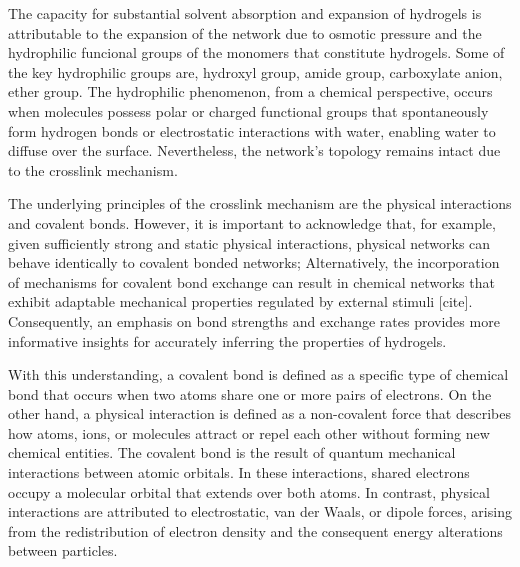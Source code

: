 The capacity for substantial solvent absorption and expansion of hydrogels is attributable to the expansion of the network due to osmotic pressure and the hydrophilic funcional groups of the monomers that constitute hydrogels.
Some of the key hydrophilic groups are,
    hydroxyl group,
    amide group,
    carboxylate anion,
    ether group.
The hydrophilic phenomenon, from a chemical perspective, occurs when molecules possess polar or charged functional groups that spontaneously form hydrogen bonds or electrostatic interactions with water, enabling water to diffuse over the surface.
Nevertheless, the network's topology remains intact due to the crosslink mechanism\citep{lelePredictionsBoundWater1997}.


The underlying principles of the crosslink mechanism are the physical interactions and covalent bonds. 
However, it is important to acknowledge that, for example, given sufficiently strong and static physical interactions, physical networks can behave identically to covalent bonded networks; 
Alternatively, the incorporation of mechanisms for covalent bond exchange can result in chemical networks that exhibit adaptable mechanical properties regulated by external stimuli [cite]. 
Consequently, an emphasis on bond strengths and exchange rates provides more informative insights for accurately inferring the properties of hydrogels\citep{priyaComprehensiveReviewHydrogel2024}.

With this understanding, a covalent bond is defined as a specific type of chemical bond that occurs when two atoms share one or more pairs of electrons.
On the other hand, a physical interaction is defined as a non-covalent force that describes how atoms, ions, or molecules attract or repel each other without forming new chemical entities.
The covalent bond is the result of quantum mechanical interactions between atomic orbitals.
In these interactions, shared electrons occupy a molecular orbital that extends over both atoms.
In contrast, physical interactions are attributed to electrostatic, van der Waals, or dipole forces, arising from the redistribution of electron density and the consequent energy alterations between particles.

